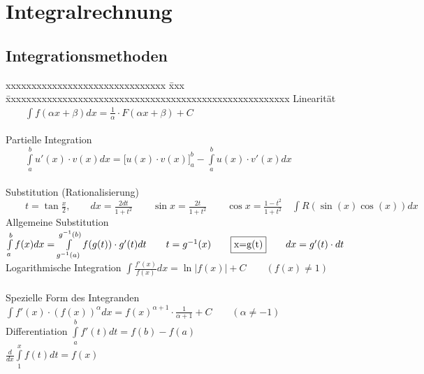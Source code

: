 \section{Integralrechnung }
\subsection{Integrationsmethoden }
  \begin{tabbing}
       xxxxxxxxxxxxxxxxxxxxxxxxxxxxxxx \= xxx \= xxxxxxxxxxxxxxxxxxxxxxxxxxxxxxxxxxxxxxxxxxxxxxxxxxxxxxx\kill  
       Linearität\>      
     $\qquad\int{f(\alpha x+\beta )dx=\frac{1}{\alpha}\cdot F(\alpha x+
    \beta)+C}$\\ \\
       Partielle Integration\>
     $\qquad\int\limits_a^b{u'(x)\cdot v(x)dx}=\biggl[ u(x)\cdot v(x) \biggr]_a^b
     -\int\limits_a^b{u(x)\cdot v'(x)dx}$\\ \\ Substitution (Rationalisierung)\>
     $\qquad t=\tan\frac{x}{2}, \qquad dx=\frac{2dt}{1+t^2} \qquad 
     \sin  x=\frac{2t}{1+t^2} \qquad \cos x=\frac{1-t^2}{1+t^2}
    \quad\int{R(\sin(x)\cos(x))dx}$\\ 
     Allgemeine Substitution \> \>
    $\int\limits_{a}^{b}{f(x)dx}=\int\limits_{g^{-1}(a)}^{g^{-1}(b)}{f(g(t))\cdot
    g'(t)dt}\qquad t=g^{-1}(x)\qquad  \fbox{x=g(t)}\qquad dx=g'(t)\cdot dt$\\
     Logarithmische Integration \>\>
      $ \int{\frac{f'(x)}{f(x)}dx}=\ln|f(x)|+C  \qquad{(f(x)\neq 1)}$\\ \\
     Spezielle Form des Integranden \>\>
    $\int{f'(x)\cdot (f(x))^{\alpha} dx}= f(x)^{\alpha +1}\cdot
    \frac{1}{\alpha+1}+C \qquad{(\alpha \neq -1)}$\\ 
     Differentiation\>\>
    $\int \limits ^{b} _{a} {f'(t)dt}=f(b)-f(a)$\\ \>\>
    $\frac{d}{dx} \int \limits ^{x} _{1} {f(t)dt}=f(x)$
    \end{tabbing}

